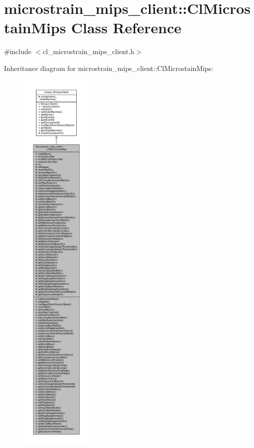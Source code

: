 \hypertarget{classmicrostrain__mips__client_1_1ClMicrostainMips}{}\section{microstrain\+\_\+mips\+\_\+client\+:\+:Cl\+Microstain\+Mips Class Reference}
\label{classmicrostrain__mips__client_1_1ClMicrostainMips}


{\ttfamily \#include $<$cl\+\_\+microstrain\+\_\+mips\+\_\+client.\+h$>$}



Inheritance diagram for microstrain\+\_\+mips\+\_\+client\+:\+:Cl\+Microstain\+Mips\+:
\nopagebreak
\begin{figure}[H]
\begin{center}
\leavevmode
\includegraphics[height=550pt]{classmicrostrain__mips__client_1_1ClMicrostainMips__inherit__graph}
\end{center}
\end{figure}


